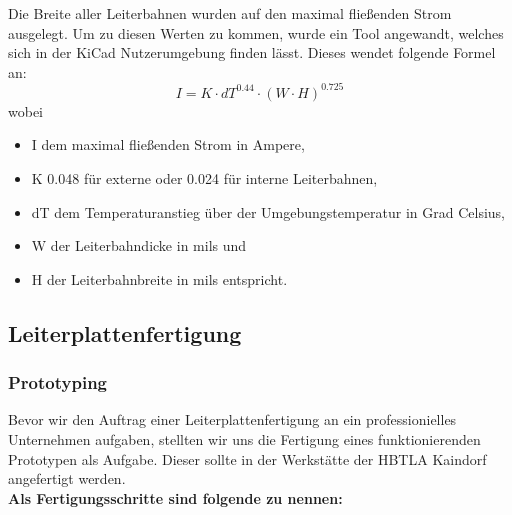 Die Breite aller Leiterbahnen wurden auf den maximal fließenden Strom ausgelegt.
Um zu diesen Werten zu kommen, wurde ein Tool angewandt, welches sich in der KiCad Nutzerumgebung finden lässt.
Dieses wendet folgende Formel an: \\

\begin{equation}
    I = K \cdot dT^{0.44} \cdot (W \cdot H)^{0.725}
\end{equation}
wobei
\begin{itemize}
    \item I dem maximal fließenden Strom in Ampere,
    \item K 0.048 für externe oder 0.024 für interne Leiterbahnen,
    \item dT dem Temperaturanstieg über der Umgebungstemperatur in Grad Celsius,
    \item W der Leiterbahndicke in mils und
    \item H der Leiterbahnbreite in mils entspricht.
\end{itemize}

\subsection{Leiterplattenfertigung}

\subsubsection{Prototyping}

Bevor wir den Auftrag einer Leiterplattenfertigung an ein professionielles Unternehmen aufgaben, stellten wir uns die Fertigung eines funktionierenden Prototypen als Aufgabe.
Dieser sollte in der Werkstätte der HBTLA Kaindorf angefertigt werden. \\

\textbf{Als Fertigungsschritte sind folgende zu nennen:}

